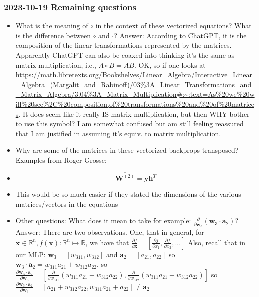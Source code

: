 \documentclass{article}
\begin{document}
\subsubsection{2023-10-19 Remaining questions}
\begin{itemize}
    \item What is the meaning of $\circ$ in the context of these vectorized equations? What is the difference between $\circ$ and $\cdot$?
    Answer: According to ChatGPT, it is the composition of the linear transformations represented by the matrices.
    Apparently ChatGPT can also be coaxed into thinking it's the same as matrix multiplication, i.e., $A \circ B = AB$.
    OK, so if one looks at  \url{https://math.libretexts.org/Bookshelves/Linear_Algebra/Interactive_Linear_Algebra_(Margalit_and_Rabinoff)/03%3A_Linear_Transformations_and_Matrix_Algebra/3.04%3A_Matrix_Multiplication#:~:text=As%20we%20will%20see%2C%20composition,of%20transformations%20and%20of%20matrices}.
    It does seem like it really IS matrix multiplication, but then WHY bother to use this symbol? I am somewhat confused but am still feeling reassured that 
    I am justified in assuming it's equiv. to matrix multiplication.
    \item Why are some of the matrices in these vectorized backprops transposed? Examples from Roger Grosse:
    \item \[ \overline{\bm{W}^{(2)}} = \overline{\bm{y}}\bm{h}^{T} \]
    \item This would be so much easier if they stated the dimensions of the various matrices/vectors in the equations
    \item Other questions: What does it mean to take for example: $\frac{\partial}{\partial{\bm{w}_3}} (\bm{w}_3 \cdot \bm{a}_2)$?
    Answer: There are two observations. One, that in general, for $\bm{x} \in \mathbb{R}^n, f(\bm{x}): \mathbb{R}^n \mapsto \mathbb{R}$,
    we have that $\frac{\partial{f}}{\partial{\bm{x}}} = [\frac{\partial{f}}{\partial{x_1}}, \frac{\partial{f}}{\partial{x_2}}, ...]$
    Also, recall that in our MLP: $\bm{w}_3 = [w_{311}, w_{312}]$ and $\bm{a}_2 = [a_{21}, a_{22}]$
    so $\bm{w}_3 \cdot \bm{a}_2 = w_{311}a_{21} + w_{312}a_{22}$, 
    so $\frac{\partial{\bm{w}_3 \cdot \bm{a}_2}}{\partial{\bm{w}_3}} = [\frac{\partial{}}{\partial{w_{311}}} (w_{311}a_{21} + w_{312}a_{22}), \frac{\partial}{\partial{w_{312}}}(w_{311}a_{21} + w_{312}a_{22})]$
    so $\frac{\partial{\bm{w}_3 \cdot \bm{a}_2}}{\partial{\bm{w}_3}} = [a_{21} + w_{312}a_{22}, w_{311}a_{21} + a_{22}] \neq \bm{a}_2$


\end{itemize}
\end{document}
